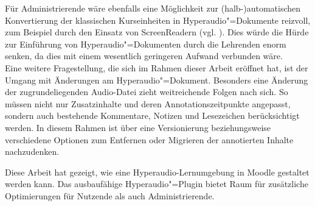 Für Administrierende wäre ebenfalls eine Möglichkeit zur (halb-)automatischen Konvertierung der klassischen Kurseinheiten in Hyperaudio"=Dokumente reizvoll, zum Beispiel durch den Einsatz von ScreenReadern (vgl. \cite{donker2007gestaltung}). Dies würde die Hürde zur Einführung von Hyperaudio"=Dokumenten durch die Lehrenden enorm senken, da dies mit einem wesentlich geringeren Aufwand verbunden wäre.\\
Eine weitere Fragestellung, die sich im Rahmen dieser Arbeit eröffnet hat, ist der Umgang mit Änderungen am Hyperaudio"=Dokument. Besonders eine Änderung der zugrundeliegenden Audio-Datei zieht weitreichende Folgen nach sich. So müssen nicht nur Zusatzinhalte und deren Annotationszeitpunkte angepasst, sondern auch bestehende Kommentare, Notizen und Lesezeichen berücksichtigt werden. In diesem Rahmen ist über eine Versionierung beziehungsweise verschiedene Optionen zum Entfernen oder Migrieren der annotierten Inhalte nachzudenken.

Diese Arbeit hat gezeigt, wie eine Hyperaudio-Lernumgebung in Moodle gestaltet werden kann. Das ausbaufähige Hyperaudio"=Plugin bietet Raum für zusätzliche Optimierungen für Nutzende als auch Administrierende.